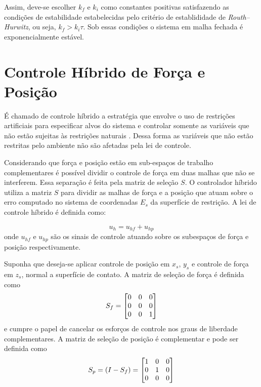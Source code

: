 Assim, deve-se escolher $k_f$ e $k_i$ como constantes positivas satisfazendo as condições de estabilidade estabelecidas pelo critério de establididade de \textit{Routh–Hurwitz}, ou seja, $k_f > k_i \tau$. Sob essas condições o sistema em malha fechada é exponencialmente estável.


\section{Controle Híbrido de Força e Posição}

É chamado de controle híbrido a estratégia que envolve o uso de restrições artificiais para especificar alvos do sistema e controlar somente as variáveis que não estão sujeitas às restrições naturais \citep{xaud2016doris}. Dessa forma as variáveis que não estão restritas pelo ambiente não são afetadas pela lei de controle.

Considerando que força e posição estão em sub-espaços de trabalho complementares é possível dividir o controle de força em duas malhas que não se interferem. Essa separação é feita pela matriz de seleção ${S}$. O controlador híbrido utiliza a matriz ${S}$ para dividir as malhas de  força e a posição  que atuam sobre o erro computado no sistema de coordenadas ${E}_s$ da superfície de restrição. A lei de controle híbrido é definida como:

\begin{equation} \label{eq:ctrl_law}
{u}_h = {u}_{hf} + {u}_{hp}
\end{equation}
onde $u_{hf}$ e $u_{hp}$ são os sinais de controle atuando sobre os subespaços de força e posição respectivamente. 

Suponha que deseja-se aplicar controle de posição em $x_s$, $y_s$ e controle de força em $z_s$, normal a superfície de contato. A matriz de seleção de força é definida como
\begin{equation}
S_f = \begin{bmatrix}
    0 & 0 & 0 \\
    0 & 0 & 0 \\
    0 & 0 & 1 
\end{bmatrix}
\end{equation}
e cumpre o papel de cancelar os esforços de controle nos graus de liberdade complementares. A matriz de seleção de posição é complementar e pode ser definida como
\begin{equation}
S_p = (I - S_f) = \begin{bmatrix}
    1 & 0 & 0 \\
    0 & 1 & 0 \\
    0 & 0 & 0 
\end{bmatrix}
\end{equation}

